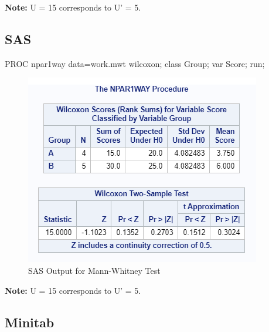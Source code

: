 \documentclass[
]{book}
\newenvironment{Shaded}{\begin{snugshade}}{\end{snugshade}}
\newcommand{\NormalTok}[1]{#1}
\begin{document}
\textbf{Note:} U = 15 corresponds to U' = 5.

\hypertarget{sas-1}{%
\subsection{SAS}\label{sas-1}}

\begin{Shaded}
\begin{Highlighting}[]
\NormalTok{PROC npar1way data=work.mwt wilcoxon;}
\NormalTok{class Group;}
\NormalTok{var Score;}
\NormalTok{run;}
\end{Highlighting}
\end{Shaded}

\begin{figure}[!h]
\includegraphics{Screenshots/Mann WHitney/mwtSAS} \caption{\label{fig:mwtSAS}SAS Output for Mann-Whitney Test}\label{fig:mwtSAS}
\end{figure}

\textbf{Note:} U = 15 corresponds to U' = 5.

\hypertarget{minitab-1}{%
\subsection{Minitab}\label{minitab-1}}
\end{document}
